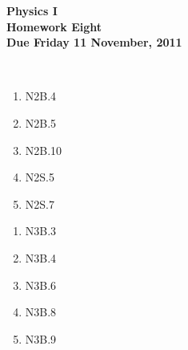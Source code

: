 \documentclass[12pt]{article}
\begin{document}
\pagestyle{empty}
 
\begin{center}
{\large {\bf Physics I}}\\
\medskip
{\large {\bf Homework Eight}}\\
\medskip
{ {\bf Due Friday 11  November, 2011}}\\
\end{center}

\hspace{2mm}\\


\begin{enumerate}
\setlength{\itemsep}{-1mm}
  \item N2B.4
  \item N2B.5
  \item N2B.10
  \item N2S.5
  \item N2S.7
\end{enumerate}


\begin{enumerate}
\setlength{\itemsep}{-1mm}
  \item N3B.3
  \item N3B.4
  \item N3B.6
  \item N3B.8
  \item N3B.9
\end{enumerate}
\end{document}
